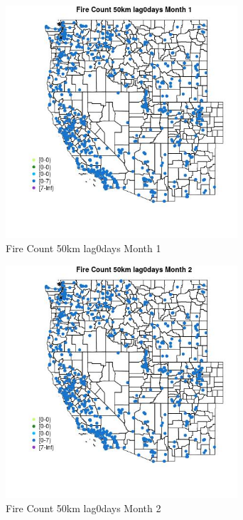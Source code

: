 \begin{figure} 
\centering  
\includegraphics[width=0.77\textwidth]{Code_Outputs/Report_ML_input_PM25_Step4_part_e_de_duplicated_aves_compiled_2019-05-21wNAs_MapObsMo1Fire_Count_50km_lag0days.jpg} 
\caption{\label{fig:Report_ML_input_PM25_Step4_part_e_de_duplicated_aves_compiled_2019-05-21wNAsMapObsMo1Fire_Count_50km_lag0days}Fire Count 50km lag0days Month 1} 
\end{figure} 
 

\begin{figure} 
\centering  
\includegraphics[width=0.77\textwidth]{Code_Outputs/Report_ML_input_PM25_Step4_part_e_de_duplicated_aves_compiled_2019-05-21wNAs_MapObsMo2Fire_Count_50km_lag0days.jpg} 
\caption{\label{fig:Report_ML_input_PM25_Step4_part_e_de_duplicated_aves_compiled_2019-05-21wNAsMapObsMo2Fire_Count_50km_lag0days}Fire Count 50km lag0days Month 2} 
\end{figure} 
 

